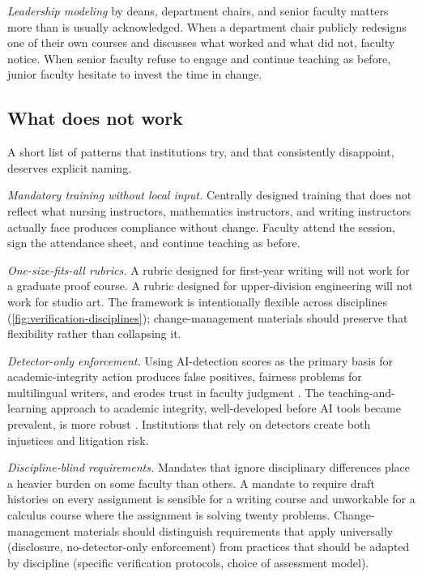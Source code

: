 \documentclass{SIAMbook2023}
\begin{document}
\textit{Leadership modeling} by deans, department chairs, and senior faculty matters more than is usually acknowledged. When a department chair publicly redesigns one of their own courses and discusses what worked and what did not, faculty notice. When senior faculty refuse to engage and continue teaching as before, junior faculty hesitate to invest the time in change.

\subsection{What does not work}
\label{u:subsec:what-doesnt-work}

A short list of patterns that institutions try, and that consistently disappoint, deserves explicit naming.

\textit{Mandatory training without local input.} Centrally designed training that does not reflect what nursing instructors, mathematics instructors, and writing instructors actually face produces compliance without change. Faculty attend the session, sign the attendance sheet, and continue teaching as before.

\textit{One-size-fits-all rubrics.} A rubric designed for first-year writing will not work for a graduate proof course. A rubric designed for upper-division engineering will not work for studio art. The framework is intentionally flexible across disciplines (\cref{fig:verification-disciplines}); change-management materials should preserve that flexibility rather than collapsing it.

\textit{Detector-only enforcement.} Using AI-detection scores as the primary basis for academic-integrity action produces false positives, fairness problems for multilingual writers, and erodes trust in faculty judgment \citep{cotton2024chatting}. The teaching-and-learning approach to academic integrity, well-developed before AI tools became prevalent, is more robust \citep{bertramgallant2017academic}. Institutions that rely on detectors create both injustices and litigation risk.

\textit{Discipline-blind requirements.} Mandates that ignore disciplinary differences place a heavier burden on some faculty than others. A mandate to require draft histories on every assignment is sensible for a writing course and unworkable for a calculus course where the assignment is solving twenty problems. Change-management materials should distinguish requirements that apply universally (disclosure, no-detector-only enforcement) from practices that should be adapted by discipline (specific verification protocols, choice of assessment model).
\end{document}
